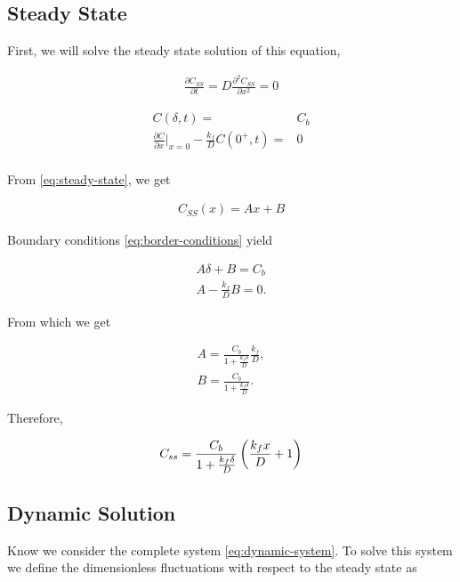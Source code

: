 	\subsection{Steady State}
	
	First, we will solve the steady state solution of this equation,
	
	\begin{align}
		\frac{\partial C_{SS}}{\partial t} = D \frac{\partial^2 C_{SS}}{\partial x^2} = 0
		\label{eq:steady-state}
	\end{align}
	
	\begin{align}
		C(\delta, t) =& C_b\\
		\frac{\partial C}{\partial x}\big|_{x=0} -\frac{k_f}{D}C(0^+,t) =& 0\\
		\label{eq:border-conditions}
	\end{align}
	
	From \ref{eq:steady-state}, we get
	
	\begin{align}
		C_{SS}(x) = A x + B
	\end{align}


Boundary conditions \ref{eq:border-conditions} yield

\begin{align}
	A\delta + B = C_b\\
	A-\frac{k_f}{D} B = 0.
\end{align}

From which we get

\begin{align}
	A = \frac{C_b}{1+\frac{k_f\delta}{D}}\frac{k_f}{D},\\
	B = \frac{C_b}{1+\frac{k_f\delta}{D}}.
\end{align}

Therefore,

\begin{align}
	C_{ss} = \frac{C_b}{1+\frac{k_f\delta}{D}} \left({\frac{k_fx}{D} + 1}\right)
	\label{eq:steady-state-sol}
\end{align}


\subsection{Dynamic Solution}

Know we consider the complete system \ref{eq:dynamic-system}. To solve this system we define the dimensionless fluctuations with respect to the steady state as

